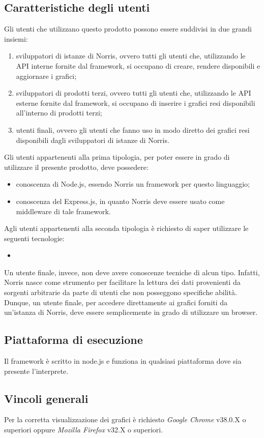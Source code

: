 	\subsection{Caratteristiche degli utenti}
		Gli utenti che utilizzano questo prodotto possono essere suddivisi in due grandi insiemi:
		\begin{enumerate}
			\item sviluppatori di istanze di Norris, ovvero tutti gli utenti che, utilizzando le API interne fornite dal framework, si occupano di creare, rendere disponibili e aggiornare i grafici;
			\item sviluppatori di prodotti terzi, ovvero tutti gli utenti che, utilizzando le API esterne fornite dal framework, si occupano di inserire i grafici resi disponibili all'interno di prodotti terzi;
			\item utenti finali, ovvero gli utenti che fanno uso in modo diretto dei grafici resi disponibili dagli sviluppatori di istanze di Norris.
		\end{enumerate}
		Gli utenti appartenenti alla prima tipologia, per poter essere in grado di utilizzare il presente prodotto, deve possedere:
		\begin{itemize}
			\item conoscenza di Node.js, essendo Norris un framework per questo linguaggio;
			\item conoscenza del Express.js, in quanto Norris deve essere usato come middleware di tale framework.
		\end{itemize}
		Agli utenti appartenenti alla seconda tipologia è richiesto di saper utilizzare le seguenti tecnologie:
		\begin{itemize}
			\item 
		\end{itemize}
		Un utente finale, invece, non deve avere conoscenze tecniche di alcun tipo. Infatti, Norris nasce come strumento per facilitare la lettura dei dati provenienti da sorgenti arbitrarie da parte di utenti che non posseggono specifiche abilità. Dunque, un utente finale, per accedere direttamente ai grafici forniti da un'istanza di Norris, deve essere semplicemente in grado di utilizzare un browser.\\
	\subsection{Piattaforma di esecuzione}
		Il framework è scritto in node.js e funziona in qualsiasi piattaforma dove sia presente l'interprete.
	\subsection{Vincoli generali}
		Per la corretta visualizzazione dei grafici è richiesto \emph{Google Chrome} v38.0.X o superiori oppure \emph{Mozilla Firefox} v32.X o superiori.
